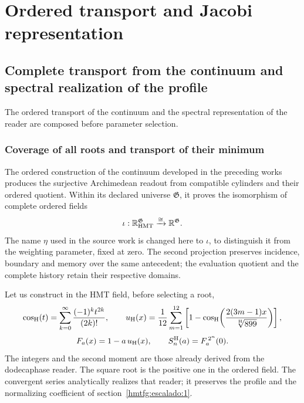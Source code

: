 \section{Ordered transport and Jacobi representation}
\label{hmtfg:fragmento:transporte-ordenado-y-representacion-de-jacobi}

\subsection{Complete transport from the continuum and spectral realization of the profile}
\label{hmtfg:escalado:14}

The ordered transport of the continuum and the spectral representation of the reader are composed before parameter selection.

\subsubsection{Coverage of all roots and transport of their minimum}
\label{hmtfg:escalado:14.1}

The ordered construction of the continuum developed in the preceding works produces the surjective Archimedean readout from compatible cylinders and their ordered quotient. Within its declared universe \(\mathfrak G\), it proves the isomorphism of complete ordered fields
\begin{equation}
\iota:\mathbb R_{\rm HMT}^{\mathfrak G}
   \xrightarrow{\cong}\mathbb R^{\mathfrak G}.
\label{hmtfg:escalado:eq:37}
\end{equation}
The name \(\eta\) used in the source work is changed here to \(\iota\), to distinguish it from the weighting parameter, fixed at zero. The second projection preserves incidence, boundary and memory over the same antecedent; the evaluation quotient and the complete history retain their respective domains.

Let us construct in the HMT field, before selecting a root,
\[
\cos_{\rm H}(t)=\sum_{k=0}^{\infty}\frac{(-1)^kt^{2k}}{(2k)!},
\qquad
u_{\rm H}(x)=\frac1{12}\sum_{m=1}^{12}
\left[1-\cos_{\rm H}\!\left(\frac{2(3m-1)x}{\sqrt[\rm H]{899}}\right)\right],
\]
\begin{equation}
F_a(x)=1-a\,u_{\rm H}(x),\qquad S_n^{\rm H}(a)=F_a^{\,2^n}(0).
\label{hmtfg:escalado:eq:38}
\end{equation}
The integers and the second moment are those already derived from the dodecaphase reader. The square root is the positive one in the ordered field. The convergent series analytically realizes that reader; it preserves the profile and the normalizing coefficient of section~\ref{hmtfg:escalado:1}.

